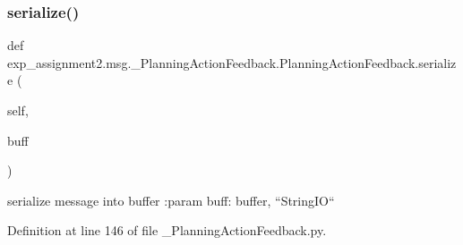 \subsubsection{\texorpdfstring{serialize()}{serialize()}}
{\footnotesize\ttfamily def exp\+\_\+assignment2.\+msg.\+\_\+\+Planning\+Action\+Feedback.\+Planning\+Action\+Feedback.\+serialize (\begin{DoxyParamCaption}\item[{}]{self,  }\item[{}]{buff }\end{DoxyParamCaption})}

\begin{DoxyVerb}serialize message into buffer
:param buff: buffer, ``StringIO``
\end{DoxyVerb}
 

Definition at line 146 of file \+\_\+\+Planning\+Action\+Feedback.\+py.


